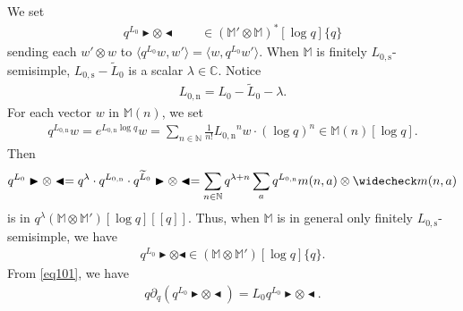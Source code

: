 \documentclass[11pt,b5paper,notitlepage]{article}
\theoremstyle{definition}
\theoremstyle{plain}
\newcommand{\wtd}{\widetilde}
\newcommand{\wch}{\widecheck}
\newcommand{\bk}[1]{\langle {#1}\rangle}
\newcommand{\Mbb}{\mathbb M}
\newcommand{\Cbb}{\mathbb C}
\newcommand{\Nbb}{\mathbb N}
\newcommand{\btl}{\blacktriangleleft}
\newcommand{\btr}{\blacktriangleright}
\newcommand{\Lss}{{L_{0,\mathrm{s}}}}
\newcommand{\Lni}{{L_{0,\mathrm{n}}}}
\numberwithin{equation}{section}
\begin{document}
We set
\begin{align}
q^{L_0}\btr\otimes\btl\qquad\in(\Mbb'\otimes\Mbb)^*[\log q]\{q\}\label{eq109}
\end{align}
sending each $w'\otimes w$ to $\bk{q^{L_0}w,w'}=\bk{w,q^{L_0}w'}$. When $\Mbb$ is finitely $\Lss$-semisimple, $\Lss-\wtd L_0$ is a scalar $\lambda\in\Cbb$.  Notice 
\begin{align}\label{eq100}
\Lni=L_0-\wtd L_0-\lambda.
\end{align}
For each vector $w$ in $\Mbb(n)$, we set
\begin{align*}
q^\Lni w=e^{\Lni\log q}w=\sum_{n\in\Nbb}\frac 1{n!}\Lni^nw\cdot (\log q)^n\in	\Mbb(n)[\log q].
\end{align*}
Then
\begin{align}
q^{L_0}\btr\otimes\btl=q^\lambda\cdot q^{\Lni}\cdot q^{\wtd L_0}\btr\otimes\btl=\sum_{n\in\Nbb}q^{\lambda+n}\sum_a q^\Lni m(n,a)\otimes\wch m(n,a)
\end{align}
is in $q^{\lambda}(\Mbb\otimes\Mbb')[\log q][[q]]$. Thus, when $\Mbb$ is in general only finitely $\Lss$-semisimple, we have
\begin{align}
q^{L_0}\btr\otimes\btl\in(\Mbb\otimes\Mbb')[\log q]\{q\}.	
\end{align}
From \eqref{eq101}, we have
\begin{align}
q\partial_q (q^{L_0}\btr\otimes\btl)=L_0q^{L_0}\btr\otimes\btl.\label{eq102}	
\end{align} 
\end{document}
